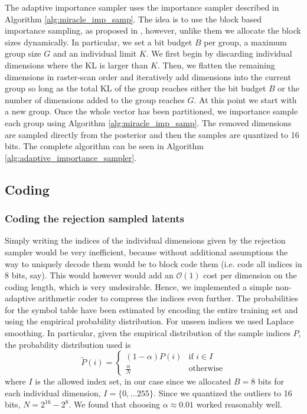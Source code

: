 \documentclass{article}
\newcommand{\Oh}{\mathcal{O}}
\begin{document}
The adaptive importance sampler uses the importance sampler described in
Algorithm \ref{alg:miracle_imp_samp}. The idea is to use the block based
importance sampling, as proposed in \cite{havasi2018minimal}, however, unlike
them we allocate the block sizes dynamically. In particular, we set a bit
budget $B$ per group, a maximum group size $G$ and an individual limit $K$.
We first begin by discarding individual dimensions where the KL is larger
than $K$. Then, we flatten the remaining dimensions in raster-scan order and 
iteratively add dimensions into the current group so long as the total KL of the
group reaches either the bit budget $B$ or the number of dimensions added to the
group reaches $G$. At this point we start with a new group. Once the whole
vector has been partitioned, we importance sample each group using Algorithm 
\ref{alg:miracle_imp_samp}. The removed dimensions are sampled directly from
the posterior and then the samples are quantized to 16 bits. The complete
algorithm can be seen in Algorithm \ref{alg:adaptive_importance_sampler}.

\subsection{Coding}
\label{sec:entropy_coding}
\par

\subsubsection{Coding the rejection sampled latents}
\label{sec:rej_samp_artihmetic_coding}
\par
Simply writing the indices of the individual dimensions given by the rejection
sampler would be very inefficient, because without additional assumptions the
way to uniquely decode them would be to block code them (i.e. code all indices
in 8 bits, say). This would however would add an $\Oh(1)$ cost per dimension on
the coding length, which is very undesirable. Hence, we implemented a simple
non-adaptive arithmetic coder \cite{rissanen1981universal} to compress the 
indices even further. The
probabilities for the symbol table have been estimated  by encoding the entire
training set and using the empirical probability distribution. For unseen
indices we used Laplace smoothing. In particular, given the empirical
distribution of the sample indices $P$, the probability distribution
used is
\[
  \tilde{P}(i) = \begin{cases}
    (1 - \alpha)P(i) & \text{if } i \in I \\
    \frac{\alpha}{N} & \text{otherwise}
    \end{cases}
\]
where $I$ is the allowed index set, in our case since we allocated $B = 8$ bits
for each individual dimension, $I = \{0, \hdots 255\}$. Since we quantized the
outliers to 16 bits, $N = 2^{16} - 2^{8}$. We found that choosing $\alpha
\approx 0.01$ worked reasonably well.
\end{document}
